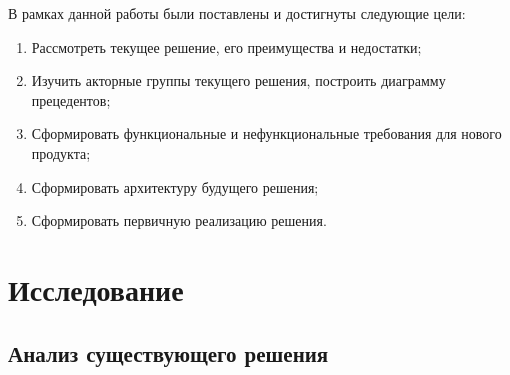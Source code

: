 \documentclass[times,numbers=noenddot]{itmo-student-thesis}
\begin{document}
В рамках данной работы были поставлены и достигнуты следующие цели:

\begin{enumerate}[label=\arabic*.]
	\item Рассмотреть текущее решение, его преимущества и недостатки;
	\item Изучить акторные группы текущего решения, построить диаграмму прецедентов;
	\item Сформировать функциональные и нефункциональные требования для нового продукта;
	\item Сформировать архитектуру будущего решения;
	\item Сформировать первичную реализацию решения.
\end{enumerate}

\leftalignedtrue
\chapter{Исследование}
\leftalignedfalse

\section{Анализ существующего решения}\label{sec:analyze_existing}
\end{document}
